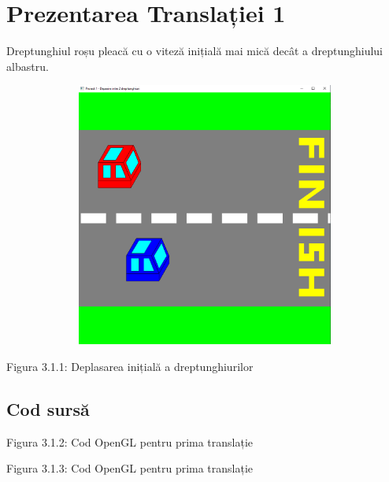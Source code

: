 \documentclass[12pt]{report}
\begin{document}
    \section{Prezentarea Translației 1}
    Dreptunghiul roșu pleacă cu o viteză inițială mai mică decât a dreptunghiului albastru.
    \begin{center}
        \includegraphics[width=15cm, height=8.7cm]{Poza3.png}
    \end{center}
    \begin{center}
        Figura 3.1.1: Deplasarea inițială a dreptunghiurilor
    \end{center}

    \subsection{Cod sursă}
    
    \begin{center}
        Figura 3.1.2: Cod OpenGL pentru prima translație
    \end{center}

    
    \begin{center}
        Figura 3.1.3: Cod OpenGL pentru prima translație
    \end{center}
\end{document}
